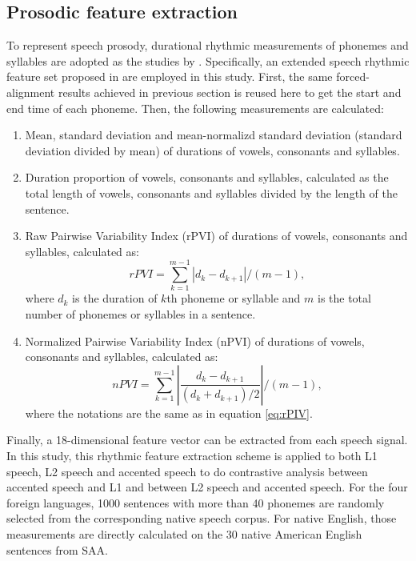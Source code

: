\subsection{Prosodic feature extraction}
\label{sec:supraseg}

To represent speech prosody, durational rhythmic measurements of phonemes and syllables are adopted as the studies by \cite{ramus1999correlates,grabe2002durational}. Specifically, an extended speech rhythmic feature set proposed in \citep{lai2013applying} are employed in this study. First, the same forced-alignment results achieved in previous section is reused here to get the start and end time of each phoneme. Then, the following measurements are calculated:
\begin{enumerate}
\item Mean, standard deviation and mean-normalizd standard deviation (standard deviation divided by mean) of durations of vowels, consonants and syllables.
\item Duration proportion of vowels, consonants and syllables, calculated as the total length of vowels, consonants and syllables divided by the length of the sentence.
\item Raw Pairwise Variability Index (rPVI) of durations of vowels, consonants and syllables, calculated as:
    \begin{equation}
    \label{eq:rPIV}
    rPVI= \sum_{k=1}^{m-1} |d_k-d_{k+1}|/(m-1),
    \end{equation}
    where $d_k$ is the duration of $k$th phoneme or syllable and $m$ is the total number of phonemes or syllables in a sentence.
\item Normalized Pairwise Variability Index (nPVI) of durations of vowels, consonants and syllables, calculated as:
    \begin{equation}
    \label{eq:nPIV}
    nPVI= \sum_{k=1}^{m-1} |\frac{d_k-d_{k+1}}{(d_k + d_{k+1})/2}|/(m-1),
    \end{equation}
    where the notations are the same as in equation \ref{eq:rPIV}.
\end{enumerate}

Finally, a 18-dimensional feature vector can be extracted from each speech signal. In this study, this rhythmic feature extraction scheme is applied to both L1 speech, L2 speech and accented speech to do contrastive analysis between accented speech and L1 and between L2 speech and accented speech. For the four foreign languages, 1000 sentences with more than 40 phonemes are randomly selected from the corresponding native speech corpus. For native English, those measurements are directly calculated on the 30 native American English sentences from SAA.

